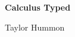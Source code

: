




\pagestyle{empty}

\begin{center}
\vspace*{2in}
{\huge \bfseries Calculus Typed}
\par
\vspace{0.3in}
{\large Taylor Hummon}
\end{center}


\cleardoublepage

\pagestyle{fancy}
